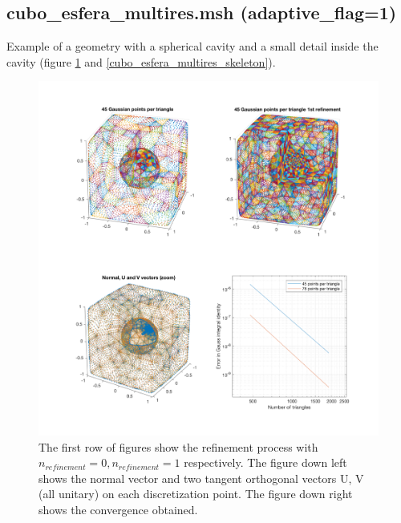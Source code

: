 \documentclass[11pt, oneside]{article}   	%
\begin{document}
\newpage
\subsection{cubo\_esfera\_multires.msh (adaptive\_flag=1)}
Example of a geometry with a spherical cavity and a small detail inside the cavity (figure \ref{cubo_esfera_multires} and \ref{cubo_esfera_multires_skeleton}).

\begin{figure}[H]
\begin{center}
\includegraphics[width=5.5in]{cubo_esfera_multires.pdf}
\end{center}
\caption{The first row of figures show the refinement process with $n_{refinement}=0, n_{refinement}=1$ respectively.
The figure down left shows the normal vector and two tangent orthogonal vectors U, V (all unitary) on each discretization point. The figure down right shows the convergence obtained. }
\label{cubo_esfera_multires}
\end{figure}
\end{document}
